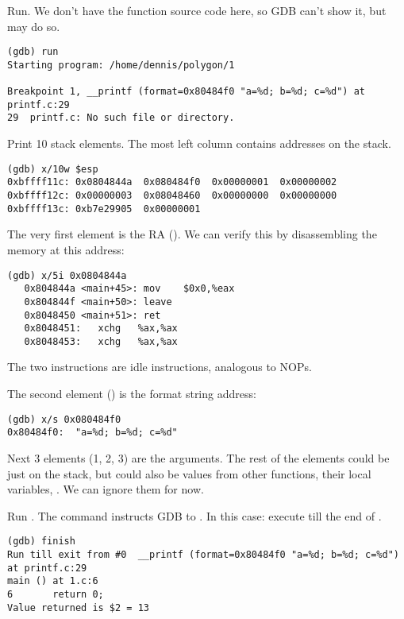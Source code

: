 Run.
We don't have the \printf function source code here, so \ac{GDB} can't show it, but may do so.

\begin{lstlisting}
(gdb) run
Starting program: /home/dennis/polygon/1 

Breakpoint 1, __printf (format=0x80484f0 "a=%d; b=%d; c=%d") at printf.c:29
29	printf.c: No such file or directory.
\end{lstlisting}

Print 10 stack elements. The most left column contains addresses on the stack.

\begin{lstlisting}
(gdb) x/10w $esp
0xbffff11c:	0x0804844a	0x080484f0	0x00000001	0x00000002
0xbffff12c:	0x00000003	0x08048460	0x00000000	0x00000000
0xbffff13c:	0xb7e29905	0x00000001
\end{lstlisting}

The very first element is the \ac{RA} ().
We can verify this by disassembling the memory at this address:

\begin{lstlisting}[label=NOP_as_XCHG_example]
(gdb) x/5i 0x0804844a
   0x804844a <main+45>:	mov    $0x0,%eax
   0x804844f <main+50>:	leave  
   0x8048450 <main+51>:	ret    
   0x8048451:	xchg   %ax,%ax
   0x8048453:	xchg   %ax,%ax
\end{lstlisting}

The two  instructions are idle instructions, analogous to \ac{NOP}s.

The second element () is the format string address:

\begin{lstlisting}
(gdb) x/s 0x080484f0
0x80484f0:	"a=%d; b=%d; c=%d"
\end{lstlisting}

Next 3 elements (1, 2, 3) are the \printf arguments.
The rest of the elements could be just  on the stack, 
but could also be values from other functions, their local variables, \etc{}.
We can ignore them for now.

Run . 
The command instructs GDB to .
In this case: execute till the end of \printf.

\begin{lstlisting}
(gdb) finish
Run till exit from #0  __printf (format=0x80484f0 "a=%d; b=%d; c=%d") at printf.c:29
main () at 1.c:6
6		return 0;
Value returned is $2 = 13
\end{lstlisting}

